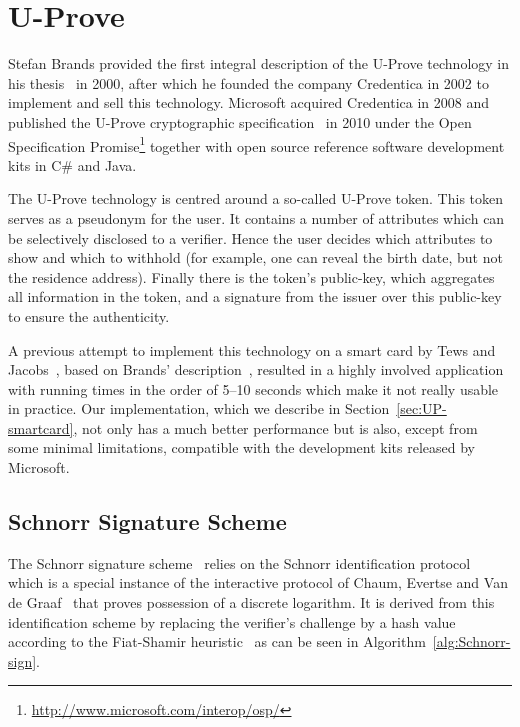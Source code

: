 \chapter{U-Prove}

Stefan Brands provided the first integral description of the U-Prove technology
in his thesis~\cite{Brands2000} in 2000, after which he founded the company
Credentica in 2002 to implement and sell this technology. Microsoft acquired
Credentica in 2008 and published the U-Prove cryptographic
specification~\cite{U-Prove_Crypto2010, U-Prove_Crypto2013} in 2010 under the
Open Specification Promise\footnote{\url{http://www.microsoft.com/interop/osp/}}
together with open source reference software development kits in C\# and Java.

The U-Prove technology is centred around a so-called U-Prove token. This token
serves as a pseudonym for the user. It contains a number of attributes which can
be selectively disclosed to a verifier. Hence the user decides which attributes
to show and which to withhold (for example, one can reveal the birth date, but
not the residence address). Finally there is the token's public-key, which
aggregates all information in the token, and a signature from the issuer over
this public-key to ensure the authenticity.

A previous attempt to implement this technology on a smart card by Tews and
Jacobs~\cite{TewsJacobs09}, based on Brands' description~\cite{Brands2000},
resulted in a highly involved application with running times in the order of
5--10 seconds which make it not really usable in practice. Our implementation,
which we describe in Section~\ref{sec:UP-smartcard}, not only has a much better
performance but is also, except from some minimal limitations, compatible with
the development kits released by Microsoft.

\section{Schnorr Signature Scheme}

The Schnorr signature scheme~\cite{Schnorr1989,Schnorr1991} relies on the
Schnorr identification protocol~\cite{Schnorr1989} which is a special instance
of the interactive protocol of Chaum, Evertse and Van de
Graaf~\cite{ChaumEvdG1988} that proves possession of a discrete logarithm. It
is derived from this identification scheme by replacing the verifier's challenge
by a hash value according to the Fiat-Shamir heuristic~\cite{FiatShamir1987} as
can be seen in Algorithm~\ref{alg:Schnorr-sign}.

